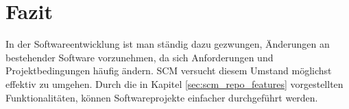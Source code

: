 \documentclass[runningheads,a4paper]{uwsese}
\begin{document}
\section{Fazit}
In der Softwareentwicklung ist man ständig dazu gezwungen, Änderungen an
bestehender Software vorzunehmen, da sich Anforderungen
und Projektbedingungen häufig ändern. SCM versucht diesem Umstand möglichst
effektiv zu umgehen. Durch die in Kapitel \ref{sec:scm_repo_features} vorgestellten
Funktionalitäten, können Softwareprojekte einfacher durchgeführt werden.



\end{document}
